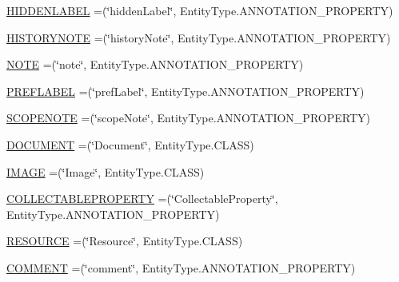 \begin{DoxyCompactItemize}
\item 
\hyperlink{enumorg_1_1semanticweb_1_1owlapi_1_1vocab_1_1_s_k_o_s_vocabulary_ab3c863aec9c6ee49ac4a06cc975d776a}{H\-I\-D\-D\-E\-N\-L\-A\-B\-E\-L} =(\char`\"{}hidden\-Label\char`\"{}, Entity\-Type.\-A\-N\-N\-O\-T\-A\-T\-I\-O\-N\-\_\-\-P\-R\-O\-P\-E\-R\-T\-Y)
\item 
\hyperlink{enumorg_1_1semanticweb_1_1owlapi_1_1vocab_1_1_s_k_o_s_vocabulary_a8517ea93a67b851ae2b90d2a0fe9418a}{H\-I\-S\-T\-O\-R\-Y\-N\-O\-T\-E} =(\char`\"{}history\-Note\char`\"{}, Entity\-Type.\-A\-N\-N\-O\-T\-A\-T\-I\-O\-N\-\_\-\-P\-R\-O\-P\-E\-R\-T\-Y)
\item 
\hyperlink{enumorg_1_1semanticweb_1_1owlapi_1_1vocab_1_1_s_k_o_s_vocabulary_a171b1fb68fd5ad1efd46c18302ac35ec}{N\-O\-T\-E} =(\char`\"{}note\char`\"{}, Entity\-Type.\-A\-N\-N\-O\-T\-A\-T\-I\-O\-N\-\_\-\-P\-R\-O\-P\-E\-R\-T\-Y)
\item 
\hyperlink{enumorg_1_1semanticweb_1_1owlapi_1_1vocab_1_1_s_k_o_s_vocabulary_a86de14fc26286301751495f93ff74bf3}{P\-R\-E\-F\-L\-A\-B\-E\-L} =(\char`\"{}pref\-Label\char`\"{}, Entity\-Type.\-A\-N\-N\-O\-T\-A\-T\-I\-O\-N\-\_\-\-P\-R\-O\-P\-E\-R\-T\-Y)
\item 
\hyperlink{enumorg_1_1semanticweb_1_1owlapi_1_1vocab_1_1_s_k_o_s_vocabulary_a2093b3897192b142d4d363874ce2fd18}{S\-C\-O\-P\-E\-N\-O\-T\-E} =(\char`\"{}scope\-Note\char`\"{}, Entity\-Type.\-A\-N\-N\-O\-T\-A\-T\-I\-O\-N\-\_\-\-P\-R\-O\-P\-E\-R\-T\-Y)
\item 
\hyperlink{enumorg_1_1semanticweb_1_1owlapi_1_1vocab_1_1_s_k_o_s_vocabulary_aa63a012f594872b8f55e5b762bfb9035}{D\-O\-C\-U\-M\-E\-N\-T} =(\char`\"{}Document\char`\"{}, Entity\-Type.\-C\-L\-A\-S\-S)
\item 
\hyperlink{enumorg_1_1semanticweb_1_1owlapi_1_1vocab_1_1_s_k_o_s_vocabulary_ad59a5a2e40347065dfe0b0fedb59643d}{I\-M\-A\-G\-E} =(\char`\"{}Image\char`\"{}, Entity\-Type.\-C\-L\-A\-S\-S)
\item 
\hyperlink{enumorg_1_1semanticweb_1_1owlapi_1_1vocab_1_1_s_k_o_s_vocabulary_a3574d28111ff2d56f30a6df7ff17ff3a}{C\-O\-L\-L\-E\-C\-T\-A\-B\-L\-E\-P\-R\-O\-P\-E\-R\-T\-Y} =(\char`\"{}Collectable\-Property\char`\"{}, Entity\-Type.\-A\-N\-N\-O\-T\-A\-T\-I\-O\-N\-\_\-\-P\-R\-O\-P\-E\-R\-T\-Y)
\item 
\hyperlink{enumorg_1_1semanticweb_1_1owlapi_1_1vocab_1_1_s_k_o_s_vocabulary_afe205f3baeafbee4f3a9951d31543b56}{R\-E\-S\-O\-U\-R\-C\-E} =(\char`\"{}Resource\char`\"{}, Entity\-Type.\-C\-L\-A\-S\-S)
\item 
\hyperlink{enumorg_1_1semanticweb_1_1owlapi_1_1vocab_1_1_s_k_o_s_vocabulary_ab80f9b35a4fc2f81e4e3e127c005fbb3}{C\-O\-M\-M\-E\-N\-T} =(\char`\"{}comment\char`\"{}, Entity\-Type.\-A\-N\-N\-O\-T\-A\-T\-I\-O\-N\-\_\-\-P\-R\-O\-P\-E\-R\-T\-Y)
\end{DoxyCompactItemize}
